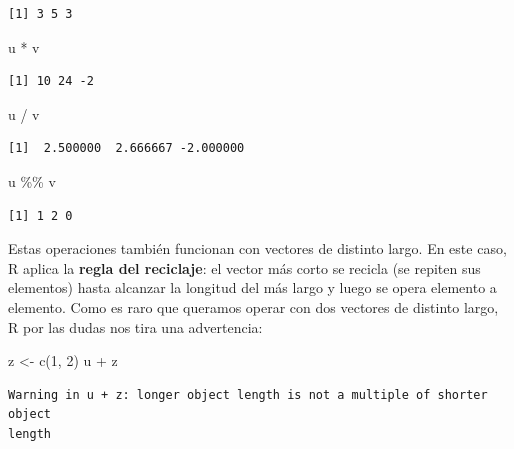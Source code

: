 \documentclass[
]{book}
\newenvironment{Shaded}{\begin{snugshade}}{\end{snugshade}}
\newcommand{\DecValTok}[1]{\textcolor[rgb]{0.00,0.00,0.81}{#1}}
\newcommand{\FunctionTok}[1]{\textcolor[rgb]{0.00,0.00,0.00}{#1}}
\newcommand{\NormalTok}[1]{#1}
\newcommand{\OtherTok}[1]{\textcolor[rgb]{0.56,0.35,0.01}{#1}}
\newcommand{\SpecialCharTok}[1]{\textcolor[rgb]{0.00,0.00,0.00}{#1}}
\begin{document}
\begin{verbatim}
[1] 3 5 3
\end{verbatim}

\begin{Shaded}
\begin{Highlighting}[]
\NormalTok{u }\SpecialCharTok{*}\NormalTok{ v}
\end{Highlighting}
\end{Shaded}

\begin{verbatim}
[1] 10 24 -2
\end{verbatim}

\begin{Shaded}
\begin{Highlighting}[]
\NormalTok{u }\SpecialCharTok{/}\NormalTok{ v}
\end{Highlighting}
\end{Shaded}

\begin{verbatim}
[1]  2.500000  2.666667 -2.000000
\end{verbatim}

\begin{Shaded}
\begin{Highlighting}[]
\NormalTok{u }\SpecialCharTok{\%\%}\NormalTok{ v}
\end{Highlighting}
\end{Shaded}

\begin{verbatim}
[1] 1 2 0
\end{verbatim}

Estas operaciones también funcionan con vectores de distinto largo. En este caso, R aplica la \textbf{regla del reciclaje}: el vector más corto se recicla (se repiten sus elementos) hasta alcanzar la longitud del más largo y luego se opera elemento a elemento. Como es raro que queramos operar con dos vectores de distinto largo, R por las dudas nos tira una advertencia:

\begin{Shaded}
\begin{Highlighting}[]
\NormalTok{z }\OtherTok{\textless{}{-}} \FunctionTok{c}\NormalTok{(}\DecValTok{1}\NormalTok{, }\DecValTok{2}\NormalTok{)}
\NormalTok{u }\SpecialCharTok{+}\NormalTok{ z}
\end{Highlighting}
\end{Shaded}

\begin{verbatim}
Warning in u + z: longer object length is not a multiple of shorter object
length
\end{verbatim}
\end{document}
